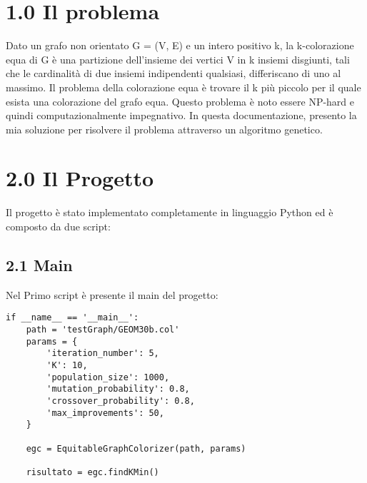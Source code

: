\documentclass[12pt]{article}
\begin{document}
\begin{flushleft}
\section*{1.0 Il problema}

Dato un grafo non orientato G = (V, E) e un intero positivo k, la k-colorazione 
equa di G è una partizione dell'insieme dei vertici V in k 
insiemi disgiunti, tali che le cardinalità di due insiemi indipendenti qualsiasi, differiscano di uno al massimo.
Il problema della colorazione equa è trovare il k più piccolo per il quale esista una colorazione del grafo equa.
Questo problema è noto essere NP-hard e quindi computazionalmente impegnativo. In questa documentazione, presento 
la mia soluzione per risolvere il problema attraverso un algoritmo genetico.


\section*{2.0 Il Progetto}
Il progetto è stato implementato completamente in linguaggio Python ed è composto da due script:



\subsection*{2.1 Main}
Nel Primo script è presente il main del progetto:\\[0.8\baselineskip]

\begin{lstlisting}[belowskip=2.6 \baselineskip]
if __name__ == '__main__':
    path = 'testGraph/GEOM30b.col'
    params = {
        'iteration_number': 5,
        'K': 10,
        'population_size': 1000,
        'mutation_probability': 0.8,
        'crossover_probability': 0.8,
        'max_improvements': 50,
    }

    egc = EquitableGraphColorizer(path, params)

    risultato = egc.findKMin()
\end{lstlisting}



\end{flushleft}
\end{document}
